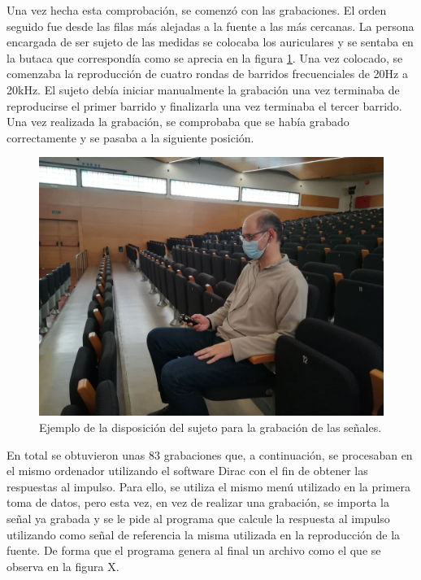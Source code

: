 \documentclass[11pt,a4paper,twoside]{book}
\begin{document}
            Una vez hecha esta comprobación, se comenzó con las grabaciones. El orden seguido fue desde las filas más alejadas a la fuente a las más cercanas. La persona encargada de ser sujeto de las medidas se colocaba los auriculares y se sentaba en la butaca que correspondía como se aprecia en la figura \ref{fig:Nico}. Una vez colocado, se comenzaba la reproducción de cuatro rondas de barridos frecuenciales de 20Hz a 20kHz. El sujeto debía iniciar manualmente la grabación una vez terminaba de reproducirse el primer barrido y finalizarla una vez terminaba el tercer barrido. Una vez realizada la grabación, se comprobaba que se había grabado correctamente y se pasaba a la siguiente posición. 
                
            \begin{figure}
                \includegraphics[scale=0.3]{../imagenes/Nico.jpg}
                \centering
                \caption{Ejemplo de la disposición del sujeto para la grabación de las señales.}
                \label{fig:Nico}
            \end{figure}
                
            En total se obtuvieron unas 83 grabaciones que, a continuación, se procesaban en el mismo ordenador utilizando el software Dirac con el fin de obtener las respuestas al impulso. Para ello, se utiliza el mismo menú utilizado en la primera toma de datos, pero esta vez, en vez de realizar una grabación, se importa la señal ya grabada y se le pide al programa que calcule la respuesta al impulso utilizando como señal de referencia la misma utilizada en la reproducción de la fuente. De forma que el programa genera al final un archivo como el que se observa en la figura X.
            
\end{document}
